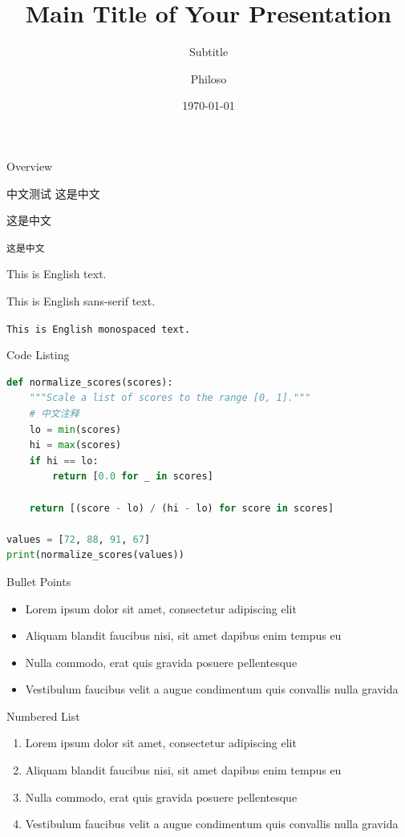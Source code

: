 \documentclass{xmu-beamer}
\title[Short Title]{Main Title of Your Presentation}
\subtitle{Subtitle}
\author{Philoso}
\institute[人工智能系·信息学院·厦门大学]{人工智能系, \newline 信息学院, \newline 厦门大学.}
\date{\today}
\begin{document}
\maketitlepage

\begin{frame}[t]{Overview}
    \tableofcontents
\end{frame}


\begin{frame}{中文测试}
    \textrm{这是中文}

    \textsf{这是中文}

    \texttt{这是中文}

    \textrm{This is English text.}

    \textsf{This is English sans-serif text.}

    \texttt{This is English monospaced text.}
\end{frame}

\begin{frame}[fragile]{Code Listing}
    \begin{lstlisting}[language=Python]
def normalize_scores(scores):
    """Scale a list of scores to the range [0, 1]."""
    # 中文注释
    lo = min(scores)
    hi = max(scores)
    if hi == lo:
        return [0.0 for _ in scores]

    return [(score - lo) / (hi - lo) for score in scores]

values = [72, 88, 91, 67]
print(normalize_scores(values))
    \end{lstlisting}
\end{frame}

\begin{frame}{Bullet Points}
    \begin{itemize}
        \item Lorem ipsum dolor sit amet, consectetur adipiscing elit
        \item Aliquam blandit faucibus nisi, sit amet dapibus enim tempus eu
        \item Nulla commodo, erat quis gravida posuere pellentesque
        \item Vestibulum faucibus velit a augue condimentum quis convallis nulla gravida
    \end{itemize}
\end{frame}

\begin{frame}{Numbered List}
    \begin{enumerate}
        \item Lorem ipsum dolor sit amet, consectetur adipiscing elit
        \item Aliquam blandit faucibus nisi, sit amet dapibus enim tempus eu
        \item Nulla commodo, erat quis gravida posuere pellentesque
        \item Vestibulum faucibus velit a augue condimentum quis convallis nulla gravida
    \end{enumerate}
\end{frame}
\end{document}
